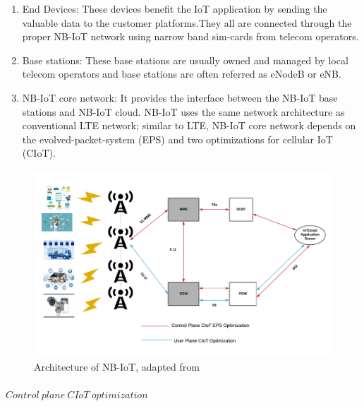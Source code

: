 \documentclass[12pt]{article}
\begin{document}
\renewcommand{\labelenumi}{\roman{enumi}}
\begin{enumerate}

    \item End Devices: These devices benefit the IoT application by sending the valuable data to the customer platforms.They all are connected through the proper NB-IoT network using narrow band sim-cards from telecom operators.
    \item Base stations: These base stations are usually owned and managed by local telecom operators and base stations are often referred as eNodeB or eNB.
    \item NB-IoT core network: It provides the interface between the NB-IoT base stations and NB-IoT cloud. NB-IoT uses the same network architecture as conventional LTE network; similar to LTE, NB-IoT core network depends on the evolved-packet-system (EPS) and two optimizations for cellular IoT (CIoT).
\end{enumerate}
\begin{figure}[H]
    \centering
    \includegraphics[width=\columnwidth, height=7cm, keepaspectratio]{Images/nb-iotArchitecture.pdf}
    \caption{Architecture of NB-IoT, adapted from \cite{jaber2019study}}
    \label{fig:NB-IoT Architecture}
\end{figure}
\paragraph{$Control \ plane\ CIoT\ optimization$}
\end{document}
